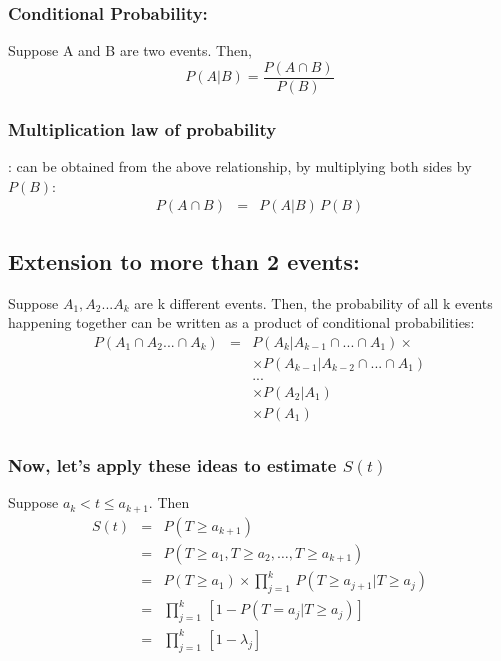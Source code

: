 \documentclass[11pt,slidesonly,semrot,portrait,palatino]{book}
\begin{document}
\subsubsection{Conditional Probability:} Suppose A and B are two events.
Then,
\[  P(A|B)  =    \frac { P(A \cap B)}  { P(B)}\]

\subsubsection{Multiplication law of probability}: can be obtained from
the above relationship, by multiplying both sides by $P(B)$:
\begin{eqnarray*}
P(A \cap B) & = & P(A|B) \, P(B)
\end{eqnarray*}

\subsection{Extension to more than 2 events:}
Suppose $A_1,  A_2 ...  A_k$ are k different events.  Then,
the probability of all k events happening together can be
written as a product of conditional probabilities:\\
\begin{eqnarray*}
   P(A_1 \cap A_2 ... \cap A_k)  & = &    P(A_k|A_{k-1} \cap ... \cap A_1) \times \\
         &  &   \times  P(A_{k-1}|A_{k-2} \cap ... \cap A_1) \\
         &  &     ...  \\
         &  &   \times P(A_2| A_1)\\
         &  &   \times P(A_1)\\
\end{eqnarray*}
\subsubsection{Now, let's apply these ideas to estimate $S(t)$}
Suppose $a_k<t\le a_{k+1}$.  Then
\begin{eqnarray*}
S(t) & = & P(T \ge a_{k+1}) \\[1ex]
& = & P(T\ge a_1, T\ge a_2,\ldots,T\ge a_{k+1})\\[1ex]
& = & P(T\ge a_1) \times \prod_{j=1}^k \, P(T\ge a_{j+1}|T\ge a_j) \\[1ex]
& = &  \prod_{j=1}^k \, [1-P(T=a_j|T\ge a_j)]\\[1ex]
& = &  \prod_{j=1}^k \, [1-\lambda_j]
\end{eqnarray*}
\end{document}
